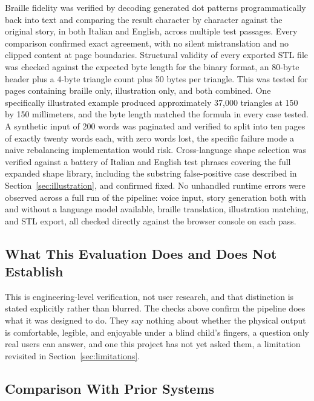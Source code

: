 \documentclass[conference]{IEEEtran}
\begin{document}
Braille fidelity was verified by decoding generated dot patterns programmatically back into text and comparing the result character by character against the original story, in both Italian and English, across multiple test passages. Every comparison confirmed exact agreement, with no silent mistranslation and no clipped content at page boundaries. Structural validity of every exported STL file was checked against the expected byte length for the binary format, an 80-byte header plus a 4-byte triangle count plus 50 bytes per triangle. This was tested for pages containing braille only, illustration only, and both combined. One specifically illustrated example produced approximately 37{,}000 triangles at 150 by 150 millimeters, and the byte length matched the formula in every case tested. A synthetic input of 200 words was paginated and verified to split into ten pages of exactly twenty words each, with zero words lost, the specific failure mode a naive rebalancing implementation would risk. Cross-language shape selection was verified against a battery of Italian and English test phrases covering the full expanded shape library, including the substring false-positive case described in Section~\ref{sec:illustration}, and confirmed fixed. No unhandled runtime errors were observed across a full run of the pipeline: voice input, story generation both with and without a language model available, braille translation, illustration matching, and STL export, all checked directly against the browser console on each pass.

\subsection{What This Evaluation Does and Does Not Establish}

This is engineering-level verification, not user research, and that distinction is stated explicitly rather than blurred. The checks above confirm the pipeline does what it was designed to do. They say nothing about whether the physical output is comfortable, legible, and enjoyable under a blind child's fingers, a question only real users can answer, and one this project has not yet asked them, a limitation revisited in Section~\ref{sec:limitations}.

\subsection{Comparison With Prior Systems}
\end{document}
